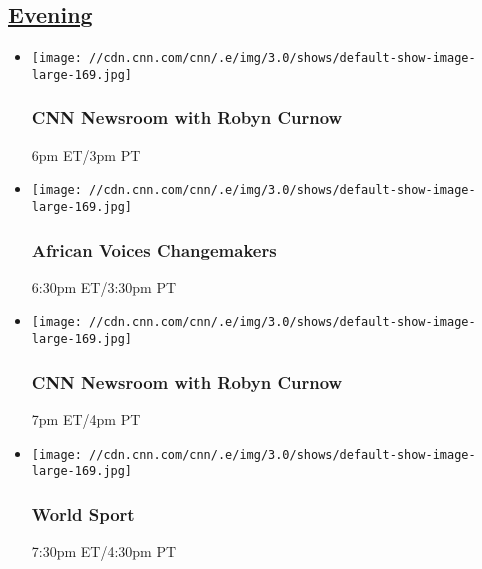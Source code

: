 \hypertarget{evening--6}{%
\subsection{\texorpdfstring{\href{/tv/schedule/cnn/index.html}{Evening}~}{Evening~}}\label{evening--6}}

\begin{itemize}
\item
  \texttt{[image: //cdn.cnn.com/cnn/.e/img/3.0/shows/default-show-image-large-169.jpg]}

  \hypertarget{cnn-newsroom-with-robyn-curnow}{%
  \subsubsection{CNN Newsroom with Robyn
  Curnow}\label{cnn-newsroom-with-robyn-curnow}}

  6pm ET/3pm PT
\end{itemize}

\begin{itemize}
\item
  \texttt{[image: //cdn.cnn.com/cnn/.e/img/3.0/shows/default-show-image-large-169.jpg]}

  \hypertarget{african-voices-changemakers-7}{%
  \subsubsection{African Voices
  Changemakers}\label{african-voices-changemakers-7}}

  6:30pm ET/3:30pm PT
\end{itemize}

\begin{itemize}
\item
  \texttt{[image: //cdn.cnn.com/cnn/.e/img/3.0/shows/default-show-image-large-169.jpg]}

  \hypertarget{cnn-newsroom-with-robyn-curnow-1}{%
  \subsubsection{CNN Newsroom with Robyn
  Curnow}\label{cnn-newsroom-with-robyn-curnow-1}}

  7pm ET/4pm PT
\end{itemize}

\begin{itemize}
\item
  \texttt{[image: //cdn.cnn.com/cnn/.e/img/3.0/shows/default-show-image-large-169.jpg]}

  \hypertarget{world-sport-19}{%
  \subsubsection{World Sport}\label{world-sport-19}}

  7:30pm ET/4:30pm PT
\end{itemize}

